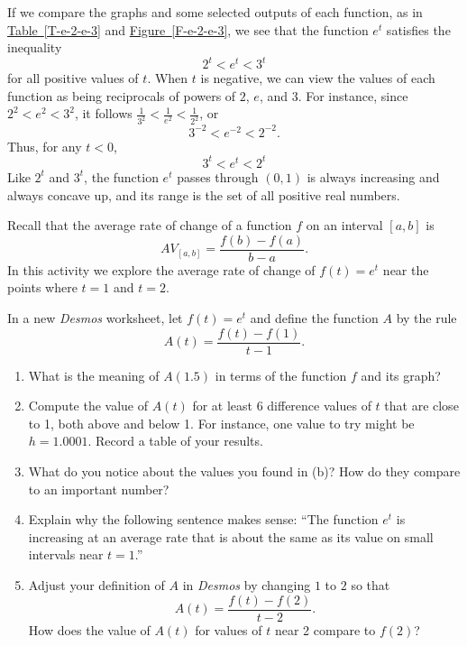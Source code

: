\documentclass[nooutcomes]{ximera}
\begin{document}
If we compare the graphs and some selected outputs of each function, as in \hyperref[T-e-2-e-3]{Table~\ref{T-e-2-e-3}} and \hyperref[F-e-2-e-3]{Figure~\ref{F-e-2-e-3}}, we see that the function $e^t$ satisfies the inequality%
\begin{equation*}
2^t < e^t < 3^t
\end{equation*}
for all positive values of $t$.  When $t$ is negative, we can view the values of each function as being reciprocals of powers of $2$, $e$, and $3$.  For instance, since $2^2 < e^2 < 3^2$, it follows $\frac{1}{3^2} < \frac{1}{e^2} < \frac{1}{2^2}$, or%
\begin{equation*}
3^{-2} < e^{-2} < 2^{-2}\text{.}
\end{equation*}
Thus, for any $t < 0$,%
\begin{equation*}
3^t < e^t < 2^t
\end{equation*}
Like $2^t$ and $3^t$, the function $e^t$ passes through $(0,1)$ is always increasing and always concave up, and its range is the set of all positive real numbers.


\begin{exploration}
Recall that the average rate of change of a function $f$ on an interval $[a,b]$ is%
\begin{equation*}
AV_{[a,b]} = \frac{f(b)-f(a)}{b-a}\text{.}
\end{equation*}
In this activity we explore the average rate of change of $f(t) = e^t$ near the points where $t = 1$ and $t = 2$.%
\par
\hypertarget{p-1392}{}%
In a new \emph{Desmos} worksheet, let $f(t) = e^t$ and define the function $A$ by the rule%
\begin{equation*}
A(t) = \frac{f(t)-f(1)}{t-1}\text{.}
\end{equation*}
\begin{enumerate}[label=\alph*.]
\item What is the meaning of $A(1.5)$ in terms of the function $f$ and its graph?%
\item Compute the value of $A(t)$ for at least $6$ difference values of $t$ that are close to 1, both above and below 1.  For instance, one value to try might be $h = 1.0001$.  Record a table of your results.%
\item\hypertarget{li-634}{}\hypertarget{p-1396}{}%
What do you notice about the values you found in (b)?  How do they compare to an important number?%
\item\hypertarget{li-635}{}\hypertarget{p-1397}{}%
Explain why the following sentence makes sense: ``The function $e^t$ is increasing at an average rate that is about the same as its value on small intervals near $t = 1$.''%
\item\hypertarget{li-636}{}\hypertarget{p-1398}{}%
Adjust your definition of $A$ in \emph{Desmos} by changing $1$ to $2$ so that%
\begin{equation*}
A(t) = \frac{f(t)-f(2)}{t-2}\text{.}
\end{equation*}
How does the value of $A(t)$ for values of $t$ near 2 compare to $f(2)$?%
\end{enumerate}

\end{exploration}
\end{document}

